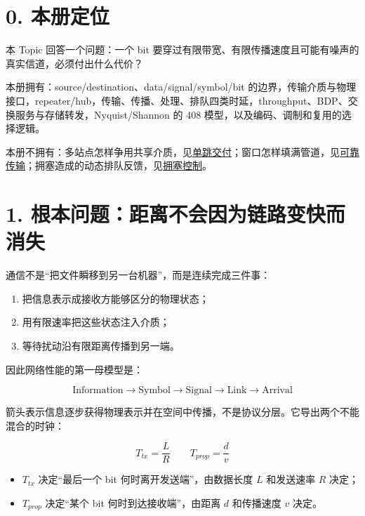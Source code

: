 \documentclass[UTF8,fontset=none,11pt,a4paper]{ctexart}
\providecommand{\tightlist}{\setlength{\itemsep}{0pt}\setlength{\parskip}{0pt}}
\begin{document}
\section{0. 本册定位}\label{0-ux672cux518cux5b9aux4f4d}

本 Topic 回答一个问题：一个 bit
要穿过有限带宽、有限传播速度且可能有噪声的真实信道，必须付出什么代价？

本册拥有：source/destination、data/signal/symbol/bit
的边界，传输介质与物理接口，repeater/hub，传输、传播、处理、排队四类时延，throughput、BDP、交换服务与存储转发，Nyquist/Shannon
的 408 模型，以及编码、调制和复用的选择逻辑。

本册不拥有：多站点怎样争用共享介质，见\href{../02_单跳交付_帧_MAC_局域网与交换机/README.md}{单跳交付}；窗口怎样填满管道，见\href{../03_可靠传输_序号_ACK_定时器与滑动窗口/README.md}{可靠传输}；拥塞造成的动态排队反馈，见\href{../07_拥塞_共享资源与反馈控制/README.md}{拥塞控制}。

\section{1.
根本问题：距离不会因为链路变快而消失}\label{1-ux6839ux672cux95eeux9898ux8dddux79bbux4e0dux4f1aux56e0ux4e3aux94feux8defux53d8ux5febux800cux6d88ux5931}

通信不是``把文件瞬移到另一台机器''，而是连续完成三件事：

\begin{enumerate}
\def\labelenumi{\arabic{enumi}.}
\tightlist
\item
  把信息表示成接收方能够区分的物理状态；
\item
  用有限速率把这些状态注入介质；
\item
  等待扰动沿有限距离传播到另一端。
\end{enumerate}

因此网络性能的第一母模型是：

\[
\boxed{
\text{Information}
\to \text{Symbol}
\to \text{Signal}
\to \text{Link}
\to \text{Arrival}
}
\]

箭头表示信息逐步获得物理表示并在空间中传播，不是协议分层。它导出两个不能混合的时钟：

\[
\boxed{T_{tx}=\frac{L}{R}}
\qquad
\boxed{T_{prop}=\frac{d}{v}}
\]

\begin{itemize}
\tightlist
\item
  \(T_{tx}\) 决定``最后一个 bit 何时离开发送端''，由数据长度 \(L\)
  和发送速率 \(R\) 决定；
\item
  \(T_{prop}\) 决定``某个 bit 何时到达接收端''，由距离 \(d\) 和传播速度
  \(v\) 决定。
\end{itemize}
\end{document}
